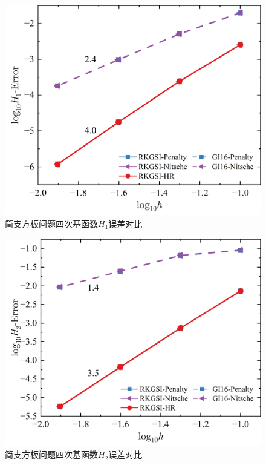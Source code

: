 \begin{figure}[H]
    \centering
    \includegraphics[scale=0.5]{figure/PHR/R/QH1.png}
    \caption{简支方板问题四次基函数$H_1$误差对比}
\end{figure}
\begin{figure}[H]
    \centering
    \includegraphics[scale=0.5]{figure/PHR/R/QH2.png}
    \caption{简支方板问题四次基函数$H_2$误差对比}
\end{figure}
\newpage

